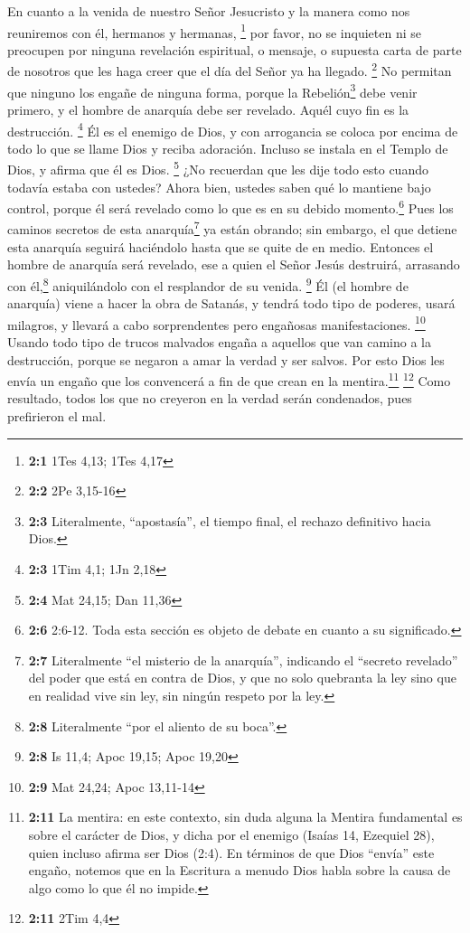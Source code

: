  En cuanto a la venida de nuestro Señor Jesucristo y la
manera como nos reuniremos con él, hermanos y hermanas, \footnote{\textbf{2:1}
  1Tes 4,13; 1Tes 4,17}  por favor, no se inquieten ni se
preocupen por ninguna revelación espiritual, o mensaje, o supuesta carta
de parte de nosotros que les haga creer que el día del Señor ya ha
llegado. \footnote{\textbf{2:2} 2Pe 3,15-16}  No permitan
que ninguno los engañe de ninguna forma, porque la Rebelión\footnote{\textbf{2:3}
  Literalmente, ``apostasía'', el tiempo final, el rechazo definitivo
  hacia Dios.} debe venir primero, y el hombre de anarquía debe ser
revelado. Aquél cuyo fin es la destrucción. \footnote{\textbf{2:3} 1Tim
  4,1; 1Jn 2,18}  Él es el enemigo de Dios, y con
arrogancia se coloca por encima de todo lo que se llame Dios y reciba
adoración. Incluso se instala en el Templo de Dios, y afirma que él es
Dios. \footnote{\textbf{2:4} Mat 24,15; Dan 11,36}  ¿No
recuerdan que les dije todo esto cuando todavía estaba con ustedes?
 Ahora bien, ustedes saben qué lo mantiene bajo control,
porque él será revelado como lo que es en su debido momento.\footnote{\textbf{2:6}
  2:6-12. Toda esta sección es objeto de debate en cuanto a su
  significado.}  Pues los caminos secretos de esta
anarquía\footnote{\textbf{2:7} Literalmente ``el misterio de la
  anarquía'', indicando el ``secreto revelado'' del poder que está en
  contra de Dios, y que no solo quebranta la ley sino que en realidad
  vive sin ley, sin ningún respeto por la ley.} ya están obrando; sin
embargo, el que detiene esta anarquía seguirá haciéndolo hasta que se
quite de en medio.  Entonces el hombre de anarquía será
revelado, ese a quien el Señor Jesús destruirá, arrasando con
él,\footnote{\textbf{2:8} Literalmente ``por el aliento de su boca''.}
aniquilándolo con el resplandor de su venida. \footnote{\textbf{2:8} Is
  11,4; Apoc 19,15; Apoc 19,20}  Él (el hombre de
anarquía) viene a hacer la obra de Satanás, y tendrá todo tipo de
poderes, usará milagros, y llevará a cabo sorprendentes pero engañosas
manifestaciones. \footnote{\textbf{2:9} Mat 24,24; Apoc 13,11-14}
 Usando todo tipo de trucos malvados engaña a aquellos
que van camino a la destrucción, porque se negaron a amar la verdad y
ser salvos.  Por esto Dios les envía un engaño que los
convencerá a fin de que crean en la mentira.\footnote{\textbf{2:11} La
  mentira: en este contexto, sin duda alguna la Mentira fundamental es
  sobre el carácter de Dios, y dicha por el enemigo (Isaías 14, Ezequiel
  28), quien incluso afirma ser Dios (2:4). En términos de que Dios
  ``envía'' este engaño, notemos que en la Escritura a menudo Dios habla
  sobre la causa de algo como lo que él no impide.} \footnote{\textbf{2:11}
  2Tim 4,4}  Como resultado, todos los que no creyeron en
la verdad serán condenados, pues prefirieron el mal.


